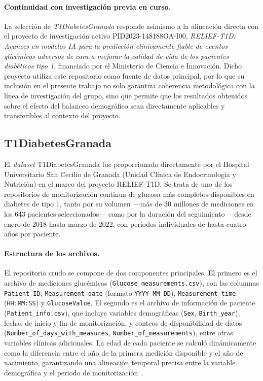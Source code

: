 \paragraph{Continuidad con investigación previa en curso.} La selección de \textit{T1DiabetesGranada} responde asimismo a la alineación directa con el proyecto de investigación activo PID2023-148188OA-I00, \textit{RELIEF-T1D: Avances en modelos IA para la predicción clínicamente fiable de eventos glicémicos adversos de cara a mejorar la calidad de vida de los pacientes diabéticos tipo 1}, financiado por el Ministerio de Ciencia e Innovación. Dicho proyecto utiliza este repositorio como fuente de datos principal, por lo que su inclusión en el presente trabajo no solo garantiza coherencia metodológica con la línea de investigación del grupo, sino que permite que los resultados obtenidos sobre el efecto del balanceo demográfico sean directamente aplicables y transferibles al contexto del proyecto.


\subsection{T1DiabetesGranada}
\label{subsec:dataset_t1dgranada}
El \textit{dataset} T1DiabetesGranada fue proporcionado directamente por el Hospital Universitario San Cecilio de Granada (Unidad Clínica de Endocrinología y Nutrición) en el marco del proyecto RELIEF-T1D. Se trata de uno de los repositorios de monitorización continua de glucosa más completos disponibles en diabetes de tipo 1, tanto por su volumen ---más de 30 millones de mediciones en los 643 pacientes seleccionados--- como por la duración del seguimiento ---desde enero de 2018 hasta marzo de 2022, con periodos individuales de hasta cuatro años por paciente.
\paragraph{Estructura de los archivos.} El repositorio crudo se compone de dos componentes principales. El primero es el archivo de mediciones glucémicas (\texttt{Glucose\_measurements.csv}), con las columnas \texttt{Patient\_ID}, \texttt{Measurement\_date} (formato \texttt{YYYY-MM-DD}), \texttt{Measurement\_time} (\texttt{HH:MM:SS}) y \texttt{GlucoseValue}. El segundo es el archivo de información de paciente (\texttt{Patient\_info.csv}), que incluye variables demográficas (\texttt{Sex}, \texttt{Birth\_year}), fechas de inicio y fin de monitorización, y conteos de disponibilidad de datos (\texttt{Number\_of\_days\_with\_measures}, \texttt{Number\_of\_measurements}), entre otras variables clínicas adicionales. La edad de cada paciente se calculó dinámicamente como la diferencia entre el año de la primera medición disponible y el año de nacimiento, garantizando una alineación temporal precisa entre la variable demográfica y el periodo de monitorización~\cite{antoniotfg}.
